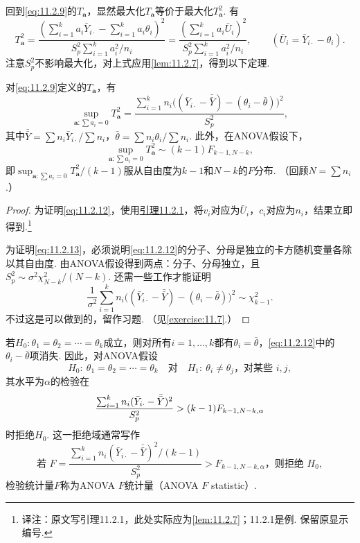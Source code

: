 回到\eqref{eq:11.2.9}的$T_{\boldsymbol a}$，显然最大化$T_{\boldsymbol a}$等价于最大化$T_{\boldsymbol a}^2$. 有
$$T_{\boldsymbol a}^2=
\frac{(\sum_{i=1}^ka_i\bar Y_{i\cdot}-\sum_{i=1}^ka_i\theta_i)^2}{S_p^2\sum_{i=1}^ka_i^2/n_i}
=\frac{(\sum_{i=1}^ka_i\bar U_i)^2}{S_p^2\sum_{i=1}^ka_i^2/n_i},
\qquad(\bar U_i=\bar Y_{i\cdot}-\theta_i).$$
注意$S_p^2$不影响最大化，对上式应用\autoref{lem:11.2.7}，得到以下定理.

\begin{theorem}\label{thm:11.2.8}
对\eqref{eq:11.2.9}定义的$T_{\boldsymbol a}$，有
\begin{equation}\label{eq:11.2.12}
\sup_{\boldsymbol a:\sum a_i=0}T_{\boldsymbol a}^2
=\frac{\sum_{i=1}^kn_i\bigl((\bar Y_{i\cdot}-\bar{\bar Y})-(\theta_i-\bar\theta)\bigr)^2}{S_p^2},
\end{equation}
其中$\bar{\bar Y}=\sum n_i\bar Y_{i\cdot}/\sum n_i$，$\bar\theta=\sum n_i\theta_i/\sum n_i$. 此外，在ANOVA假设下，
\begin{equation}\label{eq:11.2.13}
\sup_{\boldsymbol a:\sum a_i=0}T_{\boldsymbol a}^2\sim(k-1)F_{k-1,N-k},
\end{equation}
即$\sup_{\boldsymbol a:\sum a_i=0}T_{\boldsymbol a}^2/(k-1)$服从自由度为$k-1$和$N-k$的$F$分布. （回顾$N=\sum n_i$.）
\end{theorem}
\begin{proof}
为证明\eqref{eq:11.2.12}，使用\hyperref[lem:11.2.7]{引理11.2.1}，将$v_i$对应为$\bar U_i$，$c_i$对应为$n_i$，结果立即得到.\footnote{译注：原文写引理11.2.1，此处实际应为\autoref{lem:11.2.7}；11.2.1是例. 保留原显示编号.}

为证明\eqref{eq:11.2.13}，必须说明\eqref{eq:11.2.12}的分子、分母是独立的卡方随机变量各除以其自由度. 由ANOVA假设得到两点：分子、分母独立，且$S_p^2\sim\sigma^2\chi^2_{N-k}/(N-k)$. 还需一些工作才能证明
$$\frac1{\sigma^2}\sum_{i=1}^kn_i\bigl((\bar Y_{i\cdot}-\bar{\bar Y})-(\theta_i-\bar\theta)\bigr)^2\sim\chi^2_{k-1}.$$
不过这是可以做到的，留作习题. （见\autoref{exercise:11.7}.）
\end{proof}

若$H_0:\theta_1=\theta_2=\cdots=\theta_k$成立，则对所有$i=1,\ldots,k$都有$\theta_i=\bar\theta$，\eqref{eq:11.2.12}中的$\theta_i-\bar\theta$项消失. 因此，对ANOVA假设
$$H_0:\ \theta_1=\theta_2=\cdots=\theta_k\quad\text{对}\quad H_1:\ \theta_i\ne\theta_j\text{，对某些 }i,j,$$
其水平为$\alpha$的检验在
\begin{equation}\label{eq:11.2.14}\index{SI0036@F检验}
\frac{\sum_{i=1}^kn_i(\bar Y_{i\cdot}-\bar{\bar Y})^2}{S_p^2}>(k-1)F_{k-1,N-k,\alpha}
\end{equation}
时拒绝$H_0$. 这一拒绝域通常写作
$$\text{若 }F=\frac{\sum_{i=1}^kn_i(\bar Y_{i\cdot}-\bar{\bar Y})^2/(k-1)}{S_p^2}>F_{k-1,N-k,\alpha}\text{，则拒绝 }H_0,$$
检验统计量$F$称为ANOVA $F$统计量（ANOVA $F$ statistic）.

